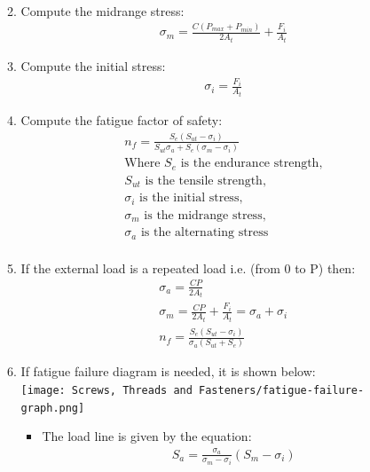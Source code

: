\documentclass[11pt, fleqn]{article}
\begin{document}
\begin{enumerate}
\begin{enumerate}
\begin{align*}
            \end{align*}
            \item Compute the midrange stress:
            \begin{align*}
                \sigma_m = \frac{C(P_{max}+P_{min})}{2A_t} + \frac{F_i}{A_t}
            \end{align*}
            \item Compute the initial stress:
            \begin{align*}
                \sigma_i = \frac{F_i}{A_t}
            \end{align*}
             \item Compute the fatigue factor of safety:
            \begin{align*}
                n_{f} = \frac{S_e(S_{ut}-\sigma_i)}{S_{ut}\sigma_a + S_e(\sigma_m - \sigma_i)}\\
                \text{Where $S_e$ is the endurance strength,}\\
                \text{$S_{ut}$ is the tensile strength,}\\
                \text{$\sigma_{i}$ is the initial stress,}\\
                \text{$\sigma_{m}$ is the midrange stress,}\\
                \text{$\sigma_{a}$ is the alternating stress}\\
            \end{align*}
            \item If the external load is a repeated load i.e. (from 0 to P) then:
            \begin{align*}
                \sigma_a = \frac{CP}{2A_t}\\
                \sigma_m = \frac{CP}{2A_t} + \frac{F_i}{A_t} = \sigma_a + \sigma_i\\
                n_f = \frac{S_e(S_{ut}-\sigma_i)}{\sigma_a (S_{ut}+S_e)}
            \end{align*}
            \item If fatigue failure diagram is needed, it is shown below:\\
            \texttt{[image: Screws, Threads and Fasteners/fatigue-failure-graph.png]}
             \begin{itemize}
                \item The load line is given by the equation:
                \begin{align*}
                    S_a = \frac{\sigma_a}{\sigma_m-\sigma_i}(S_m-\sigma_i)
                \end{align*}

\end{itemize}
\end{enumerate}
\end{enumerate}
\end{document}
